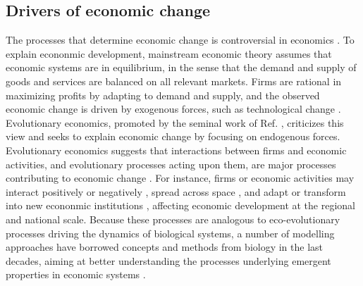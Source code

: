 \subsection{Drivers of economic change}
The processes that determine economic change is controversial in economics \citep{Nelson2014}. 
To explain econonmic development, mainstream economic theory \citep{10.1093/cje/bet027} assumes that economic systems are in equilibrium, in the sense that the demand and supply of goods and services are balanced on all relevant markets. 
Firms are rational in maximizing profits by adapting to demand and supply, and the observed economic change is driven by exogenous forces, such as technological change \citep{Romer1986}. Evolutionary economics, promoted by the seminal work of Ref. \citep{Nelson2014}, criticizes this view and seeks to explain economic change by focusing on endogenous forces. 
% 
Evolutionary economics suggests that interactions between firms and economic activities, and evolutionary processes acting upon them, are major processes contributing to economic change \citep{Hodgson2019}.
% 
For instance, firms or economic activities may interact positively or negatively \citep{Wernerfelt1989,Pistorius2007Ozman2009,Saavedra2009a,Cohendet2018,Menon2015}, spread across space \citep{RogersEverettM2003DoI,Zahra2000}, and adapt \citep{Cordes2006} or transform into new econonmic institutions  \citep{Freeman2002,Hodgson2004,Aldrich2008}, affecting economic development at the regional and national scale.
%
% 
% 
Because these processes are analogous to eco-evolutionary processes driving the dynamics of biological systems, a number of modelling approaches have borrowed concepts and methods from biology in the last decades, aiming at better understanding the processes underlying emergent properties in economic systems \citep{Tacchella2018,Saavedra2009a,Scholl2020,Zhang2018,Modis1997,Saavedra2014,Farmer1999,Michalakelis2011,Marasco2016,Gatabazi2019,Cauwels56,Applegate2021,Suweis2015}. 
